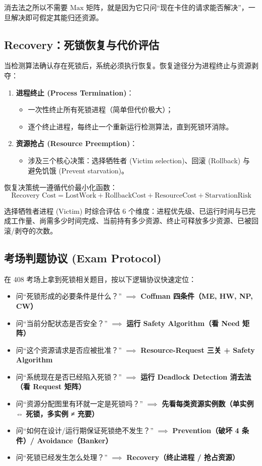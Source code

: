 \documentclass[11pt,a4paper]{ctexart}
\newcommand{\kw}[1]{\textbf{#1}}
\begin{document}
消去法之所以不需要 $\text{Max}$ 矩阵，就是因为它只问“现在卡住的请求能否解决”，一旦解决即可假定其能归还资源。

\subsection{Recovery：死锁恢复与代价评估}

当检测算法确认存在死锁后，系统必须执行恢复。恢复途径分为进程终止与资源剥夺：

\begin{enumerate}
\item \kw{进程终止 (Process Termination)}：
\begin{itemize}
\item 一次性终止所有死锁进程（简单但代价极大）；
\item 逐个终止进程，每终止一个重新运行检测算法，直到死锁环消除。
\end{itemize}
\item \kw{资源抢占 (Resource Preemption)}：
\begin{itemize}
\item 涉及三个核心决策：选择牺牲者 (Victim selection)、回滚 (Rollback) 与 避免饥饿 (Prevent starvation)。
\end{itemize}
\end{enumerate}

恢复决策统一遵循代价最小化函数：
\[
\boxed{\text{Recovery Cost} = \text{LostWork} + \text{RollbackCost} + \text{ResourceCost} + \text{StarvationRisk}}
\]

选择牺牲者进程 (Victim) 时综合评估 6 个维度：进程优先级、已运行时间与已完成工作量、尚需多少时间完成、当前持有多少资源、终止可释放多少资源、已被回滚/剥夺的次数。

\subsection{考场判题协议 (Exam Protocol)}

\begin{exam}
在 408 考场上拿到死锁相关题目，按以下逻辑协议快速定位：
\begin{itemize}
\item 问“死锁形成的必要条件是什么？” $\implies$ \kw{Coffman 四条件（ME, HW, NP, CW）}
\item 问“当前分配状态是否安全？” $\implies$ \kw{运行 Safety Algorithm（看 Need 矩阵）}
\item 问“这个资源请求是否应被批准？” $\implies$ \kw{Resource-Request 三关 + Safety Algorithm}
\item 问“系统现在是否已经陷入死锁？” $\implies$ \kw{运行 Deadlock Detection 消去法（看 Request 矩阵）}
\item 问“资源分配图里有环就一定是死锁吗？” $\implies$ \kw{先看每类资源实例数（单实例 ⇔ 死锁，多实例 ≠ 充要）}
\item 问“如何在设计/运行期保证死锁绝不发生？” $\implies$ \kw{Prevention（破坏 4 条件）/ Avoidance（Banker）}
\item 问“死锁已经发生怎么处理？” $\implies$ \kw{Recovery（终止进程 / 抢占资源）}
\end{itemize}
\end{exam}
\end{document}
